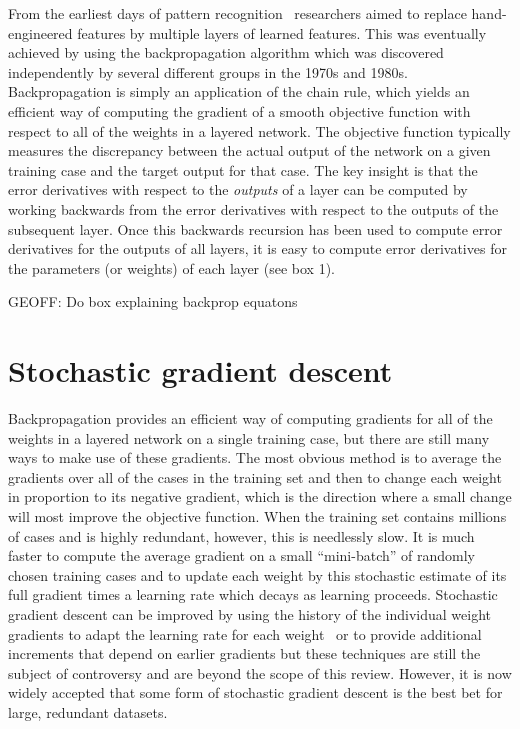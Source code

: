 \documentclass[]{article}
\begin{document}
From the earliest days of pattern recognition~\cite{selfridge,Rosenblatt57}
researchers aimed to replace hand-engineered features by multiple layers of
learned features.  This was eventually achieved by using the
backpropagation algorithm which was discovered independently by several
different groups in the 1970s and 1980s\cite{Werbos74,Parker85,LeCun85,Rumelhart86b,schmidreference}.  Backpropagation is simply an application of
the chain rule, which yields an efficient way of computing the gradient of a
smooth objective function with respect to all of the weights in a layered
network. The objective function typically measures the discrepancy between
the actual output of the network on a given training case and the target
output for that case.  The key insight is that the error derivatives with
respect to the {\it outputs} of a layer can be computed by working
backwards from the error derivatives with respect to the outputs of the
subsequent layer. Once this backwards recursion has been used to compute
error derivatives for the outputs of all layers, it is easy to compute
error derivatives for the parameters (or weights) of each layer (see box
1).

GEOFF: Do box explaining backprop equatons

\section{Stochastic gradient descent}

Backpropagation provides an efficient way of computing gradients for all of
the weights in a layered network on a single training case, but there are
still many ways to make use of these gradients. The most obvious method is
to average the gradients over all of the cases in the training set and then
to change each weight in proportion to its negative gradient, which is the
direction where a small change will most improve the objective function. 
When the training set contains millions of cases and is highly redundant, however,
this is needlessly slow. It is much faster to compute the average gradient
on a small ``mini-batch'' of randomly chosen training cases and to update
each weight by this stochastic estimate of its full gradient times a
learning rate which decays as learning proceeds. Stochastic gradient
descent can be improved by using the history of the individual weight
gradients to adapt the learning rate for each weight~\citep{bottou-bousquet-2008-small}
or to provide additional increments that depend on earlier gradients\cite{momentum}
but these techniques are still the subject of controversy and are beyond
the scope of this review.  However, it is now widely accepted that some
form of stochastic gradient descent is the best bet for large, redundant
datasets.
\end{document}
